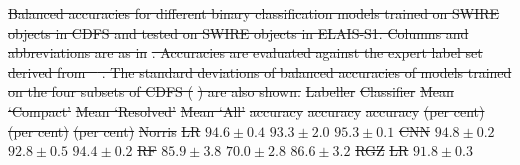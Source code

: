 \documentclass[11pt, a4paper]{book}
\providecommand{\DIFdeltex}[1]{{\protect\color{red}\sout{#1}}}                      %
\providecommand{\DIFdelFL}[1]{\DIFdel{#1}} %
\providecommand{\DIFdel}[1]{\texorpdfstring{\DIFdeltex{#1}}{}} %
\begin{document}
{%
\DIFdelFL{Balanced accuracies for different binary classification models trained on SWIRE objects
    in CDFS and tested on SWIRE objects in ELAIS-S1. Columns and abbreviations are as in }%
\DIFdelFL{. Accuracies are evaluated against the expert
    label set derived from \mbox{%
\citet{middelberg08}}\hspace{0pt}%
. The standard deviations of balanced accuracies of models trained on the four subsets of
    CDFS (}%
\DIFdelFL{) are also shown.}}
\DIFdelFL{Labeller }%
\DIFdelFL{Classifier }%
\DIFdelFL{Mean `Compact' }%
\DIFdelFL{Mean `Resolved' }%
\DIFdelFL{Mean `All'}%
\DIFdelFL{accuracy }%
\DIFdelFL{accuracy }%
\DIFdelFL{accuracy}%
\DIFdelFL{(per cent) }%
\DIFdelFL{(per cent) }%
\DIFdelFL{(per cent)}%
\DIFdelFL{Norris }%
\DIFdelFL{LR }%
\DIFdelFL{$94.6 \pm 0.4$ }%
\DIFdelFL{$93.3 \pm 2.0$ }%
\DIFdelFL{$95.3 \pm 0.1$}%
\DIFdelFL{CNN }%
\DIFdelFL{$94.8 \pm 0.2$ }%
\DIFdelFL{$92.8 \pm 0.5$ }%
\DIFdelFL{$94.4 \pm 0.2$}%
\DIFdelFL{RF }%
\DIFdelFL{$85.9 \pm 3.8$ }%
\DIFdelFL{$70.0 \pm 2.8$ }%
\DIFdelFL{$86.6 \pm 3.2$}%
\DIFdelFL{RGZ }%
\DIFdelFL{LR }%
\DIFdelFL{$91.8 \pm 0.3$ }%
\end{document}
